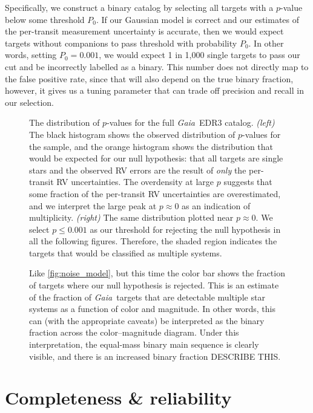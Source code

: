 \documentclass[modern, letterpaper]{aastex63}
\newcommand{\project}[1]{\textsl{#1}}
\newcommand{\Gaia}{\project{Gaia}}
\begin{document}
Specifically, we construct a binary catalog by selecting all targets with a $p$-value below some threshold $P_0$.
If our Gaussian model is correct and our estimates of the per-transit measurement uncertainty is accurate, then we would expect targets without companions to pass threshold with probability $P_0$.
In other words, setting $P_0 = 0.001$, we would expect 1 in 1,000 single targets to pass our cut and be incorrectly labelled as a binary.
This number does not directly map to the false positive rate, since that will also depend on the true binary fraction, however, it gives us a tuning parameter that can trade off precision and recall in our selection.

\begin{figure}
	\caption{The distribution of $p$-values for the full \Gaia\ EDR3 catalog.
		\emph{(left)} The black histogram shows the observed distribution of $p$-values for the sample, and the orange histogram shows the distribution that would be expected for our null hypothesis: that all targets are single stars and the observed RV errors are the result of \emph{only} the per-transit RV uncertainties.
		The overdensity at large $p$ suggests that some fraction of the per-transit RV uncertainties are overestimated, and we interpret the large peak at $p \approx 0$ as an indication of multiplicity.
		\emph{(right)} The same distribution plotted near $p \approx 0$.
		We select $p \leq 0.001$ as our threshold for rejecting the null hypothesis in all the following figures.
		Therefore, the shaded region indicates the targets that would be classified as multiple systems.
		\label{fig:p_value_dist}}
\end{figure}

\begin{figure}
	\caption{Like \autoref{fig:noise_model}, but this time the color bar shows the fraction of targets where our null hypothesis is rejected.
		This is an estimate of the fraction of \Gaia\ targets that are detectable multiple star systems as a function of color and magnitude.
		In other words, this can (with the appropriate caveats) be interpreted as the binary fraction across the color--magnitude diagram.
		Under this interpretation, the equal-mass binary main sequence is clearly visible, and there is an increased binary fraction DESCRIBE THIS.
		\label{fig:binary_fraction_cmd}}
\end{figure}

\section{Completeness \& reliability}
\end{document}
